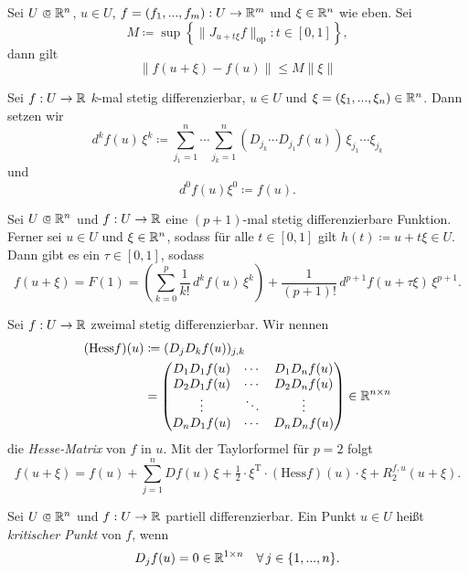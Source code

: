 \documentclass{cheat-sheet}
\begin{document}
\begin{kor}[Schrankensatz]
Sei $U \opn \R^n$, $u \in U$, $f = (f_1, ..., f_m) : U \to \mathbb{R}^m$ und $\xi \in \mathbb{R}^n$ wie eben. Sei
\[ M \coloneqq \sup \left\{ \| J_{u + t \xi} f \|_{\text{op}} : t \in [0, 1] \right\}, \]
dann gilt
\[ \| f(u + \xi) - f(u) \| \le M \| \xi \| \]
\end{kor}

\begin{nota}
Sei $f : U \to \mathbb{R}$ $k$-mal stetig differenzierbar, $u \in U$ und $\xi = (\xi_1, ..., \xi_n) \in \mathbb{R}^n$. Dann setzen wir
\[ d^k f(u)\,\xi^k \coloneqq \sum_{j_1=1}^n \cdots \sum_{j_k=1}^n (D_{j_k} \cdots D_{j_1} f(u))\,\xi_{j_1}\cdots\xi_{j_k} \]
und
\[ d^0 f(u) \xi^0 \coloneqq f(u). \]
\end{nota}

\begin{satz}
Sei $U \opn \R^n$ und $f : U \to \mathbb{R}$ eine $(p + 1)$-mal stetig differenzierbare Funktion. Ferner sei $u \in U$ und $\xi \in \mathbb{R}^n$, sodass für alle $t \in [0, 1]$ gilt $h(t) \coloneqq u + t \xi \in U$. Dann gibt es ein $\tau \in [0, 1]$, sodass
\[ f(u + \xi) = F(1) = \left( \sum_{k=0}^{p} \frac{1}{k!}\,d^k f(u)\,\xi^k \right) + \frac{1}{(p + 1)!}\,d^{p+1} f(u + \tau \xi)\,\xi^{p+1}. \]
\end{satz}

\begin{bem}[Taylorformel für $p = 2$]
Sei $f : U \to \mathbb{R}$ zweimal stetig differenzierbar. Wir nennen
\begin{align*}
  (\mathrm{Hess} f)(u) &\coloneqq (D_j D_k f(u))_{j,k}\\
  &= \begin{pmatrix} D_1 D_1 f(u) & \cdots & D_1 D_n f(u) \\ D_2 D_1 f(u) & \cdots & D_2 D_n f(u) \\ \vdots & \ddots & \vdots \\ D_n D_1 f(u) & \cdots & D_n D_n f(u) \end{pmatrix} \in \mathbb{R}^{n \times n}
\end{align*}
die \emph{Hesse-Matrix} von $f$ in $u$. Mit der Taylorformel für $p = 2$ folgt
\[ f(u + \xi) = f(u) + \sum_{j=1}^{n} D f(u)\,\xi + \tfrac{1}{2} \cdot \xi^{\text{T}} \cdot (\mathrm{Hess} f)(u) \cdot \xi + R_2^{f,u}(u + \xi). \]
\end{bem}

\begin{defn}
Sei $U \opn \R^n$ und $f : U \to \mathbb{R}$ partiell differenzierbar. Ein Punkt $u \in U$ heißt \emph{kritischer Punkt} von $f$, wenn
\[ D_j f(u) = 0 \in \mathbb{R}^{1 \times n}\quad \forall\,j \in \{ 1, ..., n \}. \]
\end{defn}
\end{document}
